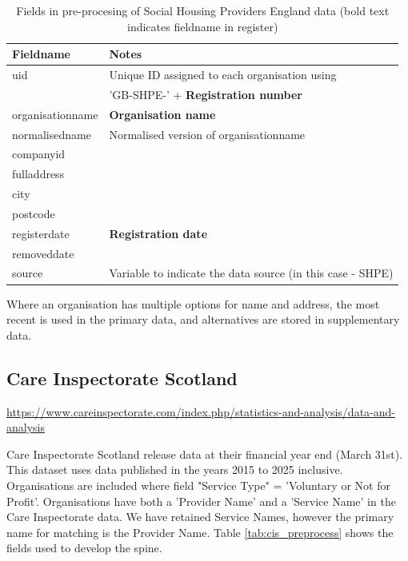 \documentclass{article}
\begin{document}
\begin{table}[h]
  \centering
  \begin{tabularx}{\textwidth}{|l|X|}
    \hline
    Fieldname  &	Notes \\
    \hline \hline
uid & Unique ID assigned to each organisation using \\
&'GB-SHPE-' + \textbf{Registration number}\\ \hline
organisationname & \textbf{Organisation name} \\ \hline
normalisedname & Normalised version of organisationname\\ \hline
companyid &  \\ \hline
fulladdress &  \\ \hline
city & \\ \hline
postcode & \\ \hline
registerdate & \textbf{Registration date} \\ \hline
removeddate & \\ \hline
source & Variable to indicate the data source (in this case - SHPE) \\ \hline
\hline 
\end{tabularx}
  \caption{Fields in pre-procesing of Social Housing Providers England data (bold text indicates fieldname in register)}
  \label{tab:shpe_preprocess}
  
\end{table}
Where an organisation has multiple options for name and address, the most recent
is used in the primary data, and alternatives are stored in supplementary data.


\clearpage
\subsection{Care Inspectorate Scotland }
\url{https://www.careinspectorate.com/index.php/statistics-and-analysis/data-and-analysis}

Care Inspectorate Scotland release data at their financial year end (March 31st). This dataset uses data published in the
years 2015 to 2025 inclusive.
Organisations are included where field "Service Type" =  'Voluntary or Not for Profit'. Organisations
have both a 'Provider Name' and a 'Service Name' in the Care Inspectorate data. We have retained
Service Names, however the primary name for matching is the Provider Name. Table \ref{tab:cis_preprocess} shows
the fields used to develop the spine.
\end{document}

